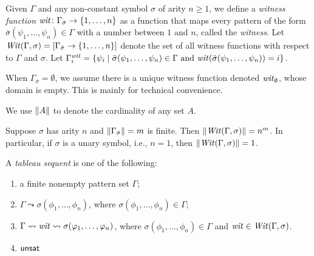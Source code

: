 \begin{definition}
Given $\Gamma$ and any non-constant symbol $\sigma$ of arity $n \ge 1$,
we define
a \emph{witness function} $\mathit{wit} \colon \Gamma_{\bar\sigma} \to \{1,\dots,n\}$
as a function that maps every pattern of the form 
$\bar\sigma(\psi_1,\dots,\psi_n) 
\in \Gamma$ with a number between $1$ and $n$, called the \emph{witness}.
Let $\mathit{Wit}(\Gamma,\sigma) = [\Gamma_{\bar\sigma} \to \{1,\dots,n\}]$ denote the set 
of all witness functions with respect to $\Gamma$ and $\sigma$.
Let $\Gamma^{\mathit{wit}}_i = \{\psi_i \mid \bar\sigma(\psi_1,\dots,\psi_n) \in \Gamma 
\text{ and } \mathit{wit}(\bar\sigma(\psi_1,\dots,\psi_n)) = i \}$.
\end{definition}

\begin{remark}
When $\Gamma_{\bar\sigma} = \emptyset$, we assume there is a unique witness 
function denoted $\mathit{wit}_\emptyset$, whose domain is empty. 
This is mainly for technical convenience. 
\end{remark}

We use \(\left\lVert A\right\rVert\) to denote the cardinality of any set \(A\).

\begin{remark}
Suppose $\sigma$ has arity $n$ and $\left\lVert \Gamma_{\bar\sigma}\right\rVert = m$  is finite.
Then $\left\lVert \mathit{Wit}(\Gamma,\sigma)\right\rVert = n^m$.
In particular, if $\sigma$ is a unary symbol, i.e., $n = 1$, then 
$\left\lVert \mathit{Wit}(\Gamma,\sigma)\right\rVert = 1$. 
\end{remark}

\begin{definition}A \emph{tableau sequent} is one of the following:

\begin{enumerate}
\def\labelenumi{\arabic{enumi}.}
\tightlist
\item
  a finite nonempty pattern set \(\Gamma\);
\item
  \(\Gamma \leadsto \sigma(\phi_1,\dots,\phi_n)\), where
  \(\sigma(\phi_1,\dots,\phi_n) \in \Gamma\);
\item
  \(\Gamma \leadsto \mathit{wit} \leadsto \sigma(\varphi_1,\dots,\varphi_n)\), where
  \(\sigma(\phi_1,\dots,\phi_n) \in \Gamma\)
  and \(\mathit{wit} \in \mathit{Wit}(\Gamma,\sigma)\).
\item
  \(\mathsf{unsat}\)
\end{enumerate}

\end{definition}

